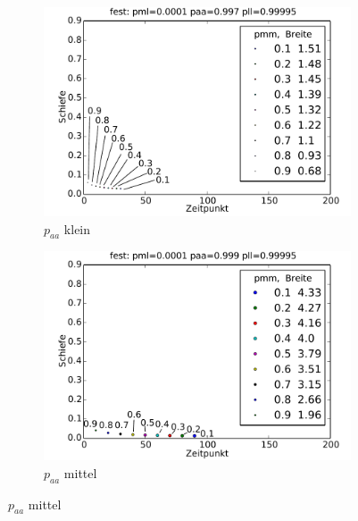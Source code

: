\begin{figure}[H]
\begin{subfigure}{0.6\textwidth}
\includegraphics[width=\textwidth]{bilder/pmm/3fest_p_00001_0997_099995}
\caption{$p_{aa}$ klein}
\end{subfigure}

\begin{subfigure}{0.6\textwidth}
\includegraphics[width=\textwidth]{bilder/pmm/3fest_p_00001_0999_099995}
\caption{$p_{aa}$ mittel}
\end{subfigure}


\end{figure}
